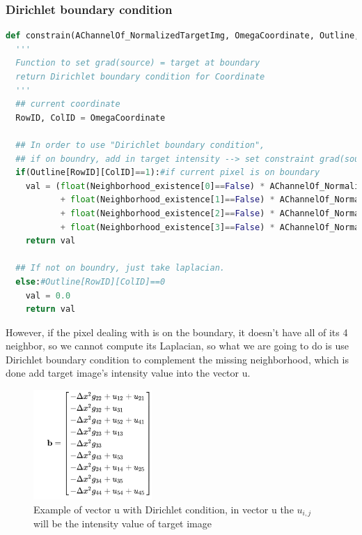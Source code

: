 \documentclass[10pt, a4paper]{article}%
\begin{document}
 \subsubsection{Dirichlet boundary condition}
 \begin{lstlisting}[language=python]
def constrain(AChannelOf_NormalizedTargetImg, OmegaCoordinate, Outline, Neighborhood_existence):
  '''
  Function to set grad(source) = target at boundary
  return Dirichlet boundary condition for Coordinate
  '''
  ## current coordinate
  RowID, ColID = OmegaCoordinate

  ## In order to use "Dirichlet boundary condition",
  ## if on boundry, add in target intensity --> set constraint grad(source) = target at boundary
  if(Outline[RowID][ColID]==1):#if current pixel is on boundary
    val = (float(Neighborhood_existence[0]==False) * AChannelOf_NormalizedTargetImg[RowID, ColID+1]#right
           + float(Neighborhood_existence[1]==False) * AChannelOf_NormalizedTargetImg[RowID, ColID-1]#left
           + float(Neighborhood_existence[2]==False) * AChannelOf_NormalizedTargetImg[RowID+1, ColID]#bottom
           + float(Neighborhood_existence[3]==False) * AChannelOf_NormalizedTargetImg[RowID-1, ColID])#up
    return val

  ## If not on boundry, just take laplacian.
  else:#Outline[RowID][ColID]==0
    val = 0.0
    return val
 \end{lstlisting}
However, if the pixel dealing with is on the boundary, it doesn't have all of its 4 neighbor, so we cannot compute its Laplacian, so what we are going to do is use Dirichlet boundary condition to complement the missing neighborhood, which is done add target image's intensity value into the vector u.
\begin{figure}[H]
    \centering
    \includegraphics[width=0.4\textwidth]{UwithDirichlet.jpg}
    \caption{Example of vector u with Dirichlet condition, in vector u the $u_{i,j}$ will be the intensity value of target image}
    \label{fig:my_label}
\end{figure}
\end{document}
